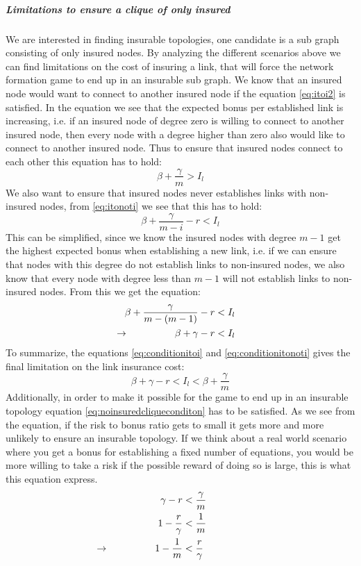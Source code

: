 \subparagraph{Limitations to ensure a clique of only insured}
We are interested in finding insurable topologies, one candidate is a sub graph consisting of only insured nodes. By analyzing the different scenarios above we can find limitations on the cost of insuring a link, that will force the network formation game to end up in an insurable sub graph.
We know that an insured node would want to connect to another insured node if the equation \ref{eq:itoi2} is satisfied. 
In the equation we see that the expected bonus per established link is increasing, i.e. if an insured node of degree zero is willing to connect to another insured node, then every node with a degree higher than zero also would like to connect to another insured node. Thus to ensure that insured nodes connect to each other this equation has to hold:
\begin{equation}
\beta+\frac{\gamma}{m}>I_{l}
\label{eq:conditionitoi}
\end{equation}
We also want to ensure that insured nodes never establishes links with non-insured nodes, from \ref{eq:itonoti} we see that this has to hold:
\begin{equation}
\beta+\frac{\gamma}{m-i}-r < I_{l}
\label{eq:conditionitonoti}
\end{equation}
This can be simplified, since we know the insured nodes with degree $m-1$ get the highest expected bonus when establishing a new link, i.e. if we can ensure that nodes with this degree do not establish links to non-insured nodes, we also know that every node with degree less than $m-1$ will not establish links to non-insured nodes. From this we get the equation:
\begin{eqnarray}
\beta+\frac{\gamma}{m-(m-1)}-r&<I_{l} \nonumber\\
\llap{$\rightarrow$\hspace{50pt}} \beta+\gamma-r&<I_{l}
\label{eq:condition-i-to-noti}
\end{eqnarray}
To summarize, the equations \ref{eq:conditionitoi} and \ref{eq:conditionitonoti} gives the final limitation on the link insurance cost:
\begin{equation}
\beta+\gamma-r<I_{l}<\beta+\frac{\gamma}{m}
\label{eq:final-insurance-clique-condition}
\end{equation}
Additionally, in order to make it possible for the game to end up in an insurable topology equation \ref{eq:noinsuredcliqueconditon} has to be satisfied. As we see from the equation, if the risk to bonus ratio gets to small it gets more and more unlikely to ensure an insurable topology. If we think about a real world scenario where you get a bonus for establishing a fixed number of equations, you would be more willing to take a risk if the possible reward of doing so is large, this is what this equation express. 
\begin{eqnarray}
\gamma-r &<\frac{\gamma}{m}\nonumber \\
1-\frac{r}{\gamma}&<\frac{1}{m} \nonumber \\
\llap{$\rightarrow$\hspace{50pt}}1-\frac{1}{m}&<\frac{r}{\gamma}
\label{eq:noinsuredcliqueconditon}
\end{eqnarray}

